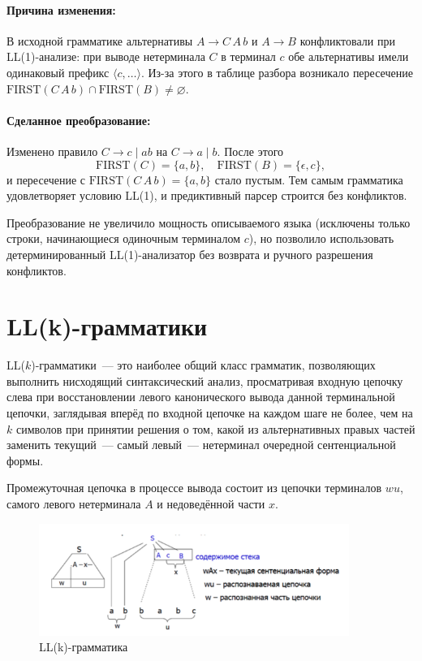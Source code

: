 \documentclass[areasetadvanced]{scrartcl}
\begin{document}
\bigskip

\paragraph{Причина изменения:}
В исходной грамматике альтернативы
\(
A \rightarrow C\,A\,b
\) и
\(
A \rightarrow B
\)
конфликтовали при LL(1)-анализе:
при выводе нетерминала \(C\) в терминал \(c\) обе альтернативы имели
одинаковый префикс \(\langle c,\dots\rangle\).
Из-за этого в таблице разбора возникало пересечение
\(
\text{FIRST}(C\,A\,b)\cap\text{FIRST}(B)\neq\varnothing.
\)

\paragraph{Сделанное преобразование:}
Изменено правило \(C\to c \mid ab\) на \(C\to a \mid b\).
После этого
\[
\text{FIRST}(C)=\{a,b\},\quad
\text{FIRST}(B)=\{\epsilon,c\},
\]
и пересечение с
\(\text{FIRST}(C\,A\,b)=\{a,b\}\) стало пустым.  
Тем самым грамматика удовлетворяет условию LL(1), и
предиктивный парсер строится без конфликтов.

Преобразование не увеличило мощность описываемого языка
(исключены только строки, начинающиеся одиночным терминалом \(c\)),
но позволило использовать детерминированный LL(1)-анализатор
без возврата и ручного разрешения конфликтов.

\newpage
\section{LL(k)-грамматики}

LL($k$)-грамматики~--- это наиболее общий класс грамматик, позволяющих выполнить нисходящий синтаксический анализ, просматривая входную цепочку слева при восстановлении левого канонического вывода данной терминальной цепочки, заглядывая вперёд по входной цепочке на каждом шаге не более, чем на $k$ символов при принятии решения о том, какой из альтернативных правых частей заменить текущий~--- самый левый~--- нетерминал очередной сентенциальной формы.

Промежуточная цепочка в процессе вывода состоит из цепочки терминалов $wu$, самого левого нетерминала $A$ и недоведённой части $x$.

\begin{figure}[H]
    \centering
    \includegraphics[width=0.9\textwidth]{images/wu.png}
    \caption{LL(k)-грамматика}
    \label{llk}
\end{figure}
\end{document}
